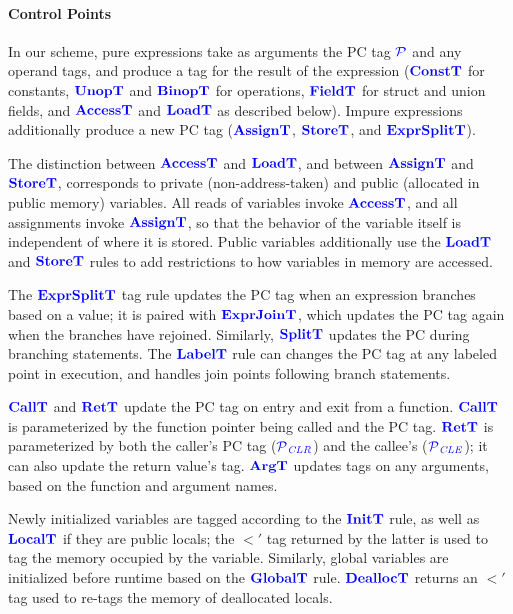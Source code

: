 \documentclass{llncs}
\begin{document}
\paragraph{Control Points}

In our scheme, pure expressions take as arguments the PC tag \(\PCT\) and any operand tags,
and produce a tag for the result of the expression (\(\consttname\) for constants,
\(\unoptname\) and \(\binoptname\) for operations, \(\fieldtname\) for struct and union fields,
and \(\accesstname\) and \(\loadtname\) as described below).
Impure expressions additionally produce a new PC tag (\(\assigntname\), \(\storetname\),
and \(\exprsplittname\)).

The distinction between \(\accesstname\) and \(\loadtname\), and between
\(\assigntname\) and \(\storetname\), corresponds to private (non-address-taken)
and public (allocated in public memory) variables. All reads of variables invoke
\(\accesstname\), and all assignments invoke \(\assigntname\), so that the behavior of the
variable itself is independent of where it is stored. Public variables
additionally use the \(\loadtname\) and \(\storetname\) rules to add restrictions to how
variables in memory are accessed.

The \(\exprsplittname\) tag rule updates the PC tag when an expression branches
based on a value; it is paired with \(\exprjointname\), which updates the PC tag again
when the branches have rejoined. Similarly, \(\splittname\) updates the PC during
branching statements. The \(\labeltname\) rule can changes the PC tag at any labeled point in execution,
and handles join points following branch statements. %

\(\calltname\) and \(\rettname\) update the PC tag on entry and exit from a function.
\(\calltname\) is parameterized by the function pointer being called and the PC tag.
\(\rettname\) is parameterized by both the caller's PC tag (\(\PCT[_{\color{blue} CLR}]\))
and the callee's (\(\PCT[_{\color{blue} CLE}]\)); it can also update the return value's tag.
\(\argtname\) updates tags on any arguments, based on the function and argument names.

Newly initialized variables are tagged according to the \(\inittname\) rule, as
well as \(\localtname\) if they are public locals; the \(\lt'\) tag returned by 
the latter is used to tag the memory occupied by the variable.
Similarly, global variables are initialized
before runtime based on the \(\globaltname\) rule. \(\dealloctname\) returns an
\(\lt'\) tag used to re-tags the memory of deallocated locals.
\end{document}
